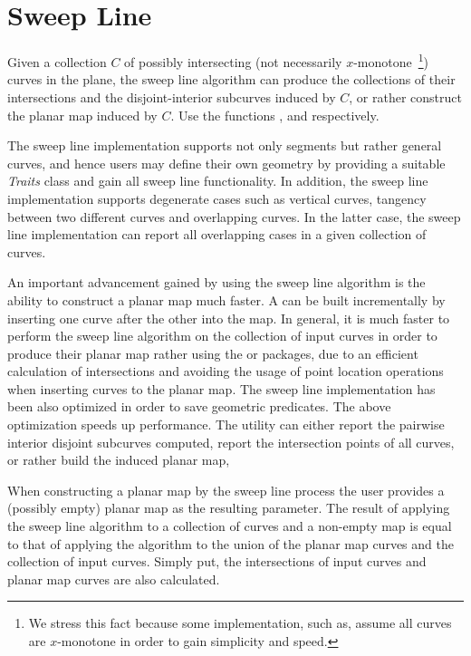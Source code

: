 \section{Sweep Line}


Given a collection $C$ of possibly intersecting 
(not necessarily $x$-monotone~\footnote{
We stress this fact because some implementation, such as, 
 assume all curves are $x$-monotone 
in order to gain simplicity and speed.}) 
curves in the plane, the sweep line algorithm can produce the collections of their 
intersections and the disjoint-interior subcurves induced by $C$, or rather 
construct the planar map induced by $C$. Use the functions ,
 and  respectively.

The sweep line implementation supports not only segments but rather 
general curves, and hence users may define their own geometry by providing a 
suitable {\em Traits} class and gain all sweep line functionality. 
In addition, the sweep line implementation supports degenerate cases such as  
vertical curves, tangency between two different curves and overlapping curves. 
In the latter case, the sweep line implementation can report all overlapping cases 
in a given collection of curves. 
 
An important advancement gained by using the sweep line algorithm 
is the ability to construct a planar map much faster.
A  can be built incrementally by
inserting one curve after the other into the map. 
In general, it is much faster to perform the sweep line algorithm on
the collection of input curves in order to produce their planar map 
rather using the  
or  packages, due to an 
efficient calculation of intersections and avoiding the usage of 
point location operations when inserting curves to the planar map. 
The sweep line implementation has been also optimized in order to 
save geometric predicates. The above optimization speeds up performance. 
The utility can either report the pairwise interior disjoint subcurves
computed, report the intersection points of all curves, 
or rather build the induced planar map, 

When constructing a planar map by the sweep line process the user 
provides a (possibly empty) planar map as the resulting parameter. 
The result of applying the sweep line algorithm to a 
collection of curves and a non-empty map is equal to that 
of applying the algorithm to the union of the
planar map curves and the collection of input curves. Simply put,
the intersections of input curves and planar map curves are also
calculated.

